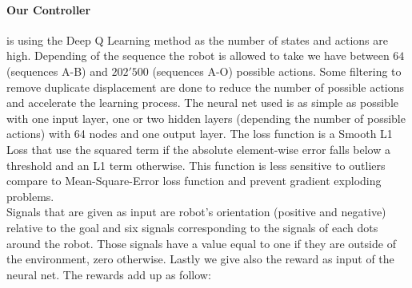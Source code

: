         \paragraph{Our Controller} is using the Deep Q Learning method as the number of states and actions are high. Depending of the sequence the robot is allowed to take we have between $64$ (sequences A-B) and $202'500$ (sequences A-O) possible actions. Some filtering to remove duplicate displacement are done to reduce the number of possible actions and accelerate the learning process. The neural net used is as simple as possible with one input layer, one or two hidden layers (depending the number of possible actions) with 64 nodes and one output layer. The loss function is a Smooth L1 Loss that use the squared term if the absolute element-wise error falls below a threshold and an L1 term otherwise. This function is less sensitive to outliers compare to Mean-Square-Error loss function and prevent gradient exploding problems.\\
        Signals that are given as input are robot's orientation (positive and negative) relative to the goal and six signals corresponding to the signals of each dots around the robot. Those signals have a value equal to one if they are outside of the environment, zero otherwise. Lastly we give also the reward as input of the neural net. The rewards add up as follow:
